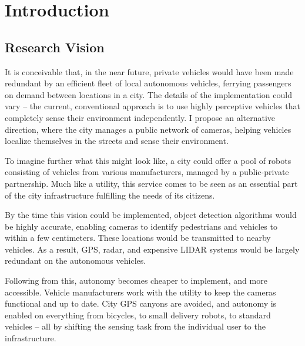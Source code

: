 \documentclass[a4paper,12pt,twoside,openright]{report}
\begin{document}
\pagestyle{empty}
\singlespacing

\onehalfspacing

\singlespacing


\setcounter{page}{0}
\pagestyle{plain}
\tableofcontents
\listoffigures
\listoftables

\onehalfspacing


\chapter{Introduction}
\setcounter{page}{1} 

\section{Research Vision}

It is conceivable that, in the near future, private vehicles would have been made redundant by an efficient
fleet of local autonomous vehicles, ferrying passengers on demand between locations in 
a city. The details of the implementation could vary -- the current, conventional
approach is to use highly perceptive vehicles that completely sense their environment independently.
I propose an alternative direction, where the city manages a public network of
cameras, helping vehicles localize themselves in the streets and sense their environment.

To imagine further what this might look like, a city could offer a pool of robots
consisting of vehicles from various manufacturers, managed by a public-private partnership. 
Much like a utility, this service comes to be seen as an essential 
part of the city infrastructure fulfilling the needs of its citizens.

By the time this vision could be implemented, object detection algorithms would be
highly accurate, enabling cameras to identify pedestrians and vehicles to within a few centimeters. 
These locations would be transmitted to nearby vehicles. As a result, GPS, radar, and expensive LIDAR systems
would be largely redundant on the autonomous vehicles.

Following from this, autonomy becomes cheaper to implement,
and more accessible. Vehicle manufacturers work with the utility to keep the cameras 
functional and up to date. City GPS canyons are avoided, and autonomy is enabled 
on everything from bicycles, to small delivery robots, to standard vehicles -- all by 
shifting the sensing task from the individual user to the infrastructure.
\end{document}
